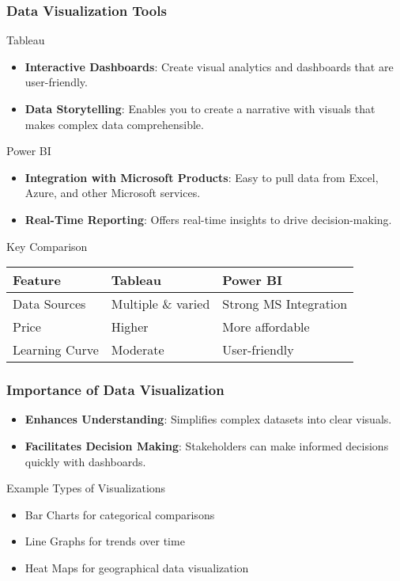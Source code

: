 \documentclass{beamer}
\begin{document}
\begin{frame}
    \frametitle{Data Visualization Tools}
    \begin{block}{Tableau}
        \begin{itemize}
            \item \textbf{Interactive Dashboards}: Create visual analytics and dashboards that are user-friendly.
            \item \textbf{Data Storytelling}: Enables you to create a narrative with visuals that makes complex data comprehensible.
        \end{itemize}
    \end{block}
    
    \begin{block}{Power BI}
        \begin{itemize}
            \item \textbf{Integration with Microsoft Products}: Easy to pull data from Excel, Azure, and other Microsoft services.
            \item \textbf{Real-Time Reporting}: Offers real-time insights to drive decision-making.
        \end{itemize}
    \end{block}
    
    \begin{block}{Key Comparison}
        \begin{tabular}{|l|l|l|}
            \hline
            Feature & Tableau & Power BI \\
            \hline
            Data Sources & Multiple \& varied & Strong MS Integration \\
            Price & Higher & More affordable \\
            Learning Curve & Moderate & User-friendly \\
            \hline
        \end{tabular}
    \end{block}
\end{frame}

\begin{frame}
    \frametitle{Importance of Data Visualization}
    \begin{itemize}
        \item \textbf{Enhances Understanding}: Simplifies complex datasets into clear visuals.
        \item \textbf{Facilitates Decision Making}: Stakeholders can make informed decisions quickly with dashboards.
    \end{itemize}
    
    \begin{block}{Example Types of Visualizations}
        \begin{itemize}
            \item Bar Charts for categorical comparisons
            \item Line Graphs for trends over time
            \item Heat Maps for geographical data visualization
        \end{itemize}
    \end{block}
\end{frame}
\end{document}
